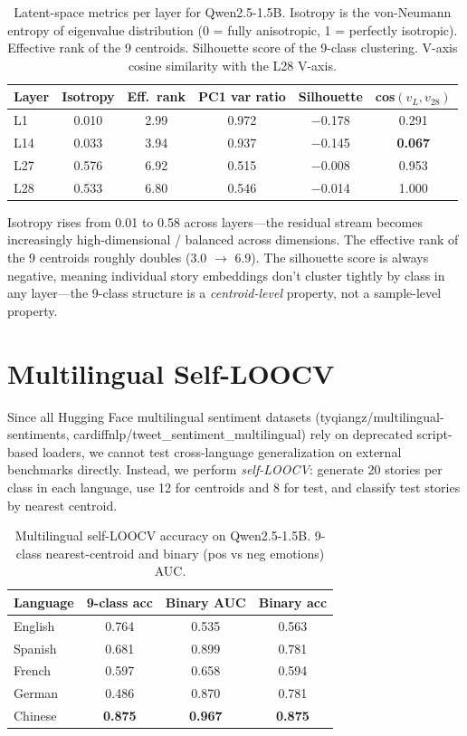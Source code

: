 \begin{table}[h]
\centering
\small
\caption{Latent-space metrics per layer for Qwen2.5-1.5B. Isotropy is the
von-Neumann entropy of eigenvalue distribution (0 = fully anisotropic, 1 =
perfectly isotropic). Effective rank of the 9 centroids. Silhouette score
of the 9-class clustering. V-axis cosine similarity with the L28 V-axis.}
\label{tab:sup_latent}
\begin{tabular}{lccccc}
\toprule
Layer & Isotropy & Eff.\ rank & PC1 var ratio & Silhouette & cos$(v_L, v_{28})$ \\
\midrule
L1 & 0.010 & 2.99 & 0.972 & $-$0.178 & 0.291 \\
L14 & 0.033 & 3.94 & 0.937 & $-$0.145 & \textbf{0.067} \\
L27 & 0.576 & 6.92 & 0.515 & $-$0.008 & 0.953 \\
L28 & 0.533 & 6.80 & 0.546 & $-$0.014 & 1.000 \\
\bottomrule
\end{tabular}
\end{table}

Isotropy rises from 0.01 to 0.58 across layers---the residual stream becomes
increasingly high-dimensional / balanced across dimensions. The effective
rank of the 9 centroids roughly doubles (3.0 $\to$ 6.9). The silhouette
score is always negative, meaning individual story embeddings don't cluster
tightly by class in any layer---the 9-class structure is a
\emph{centroid-level} property, not a sample-level property.

\section{Multilingual Self-LOOCV}
\label{sup:multilingual}

Since all Hugging Face multilingual sentiment datasets (tyqiangz/multilingual-sentiments,
cardiffnlp/tweet\_sentiment\_multilingual) rely on deprecated script-based
loaders, we cannot test cross-language generalization on external
benchmarks directly. Instead, we perform \emph{self-LOOCV}: generate 20
stories per class in each language, use 12 for centroids and 8 for test,
and classify test stories by nearest centroid.

\begin{table}[h]
\centering
\caption{Multilingual self-LOOCV accuracy on Qwen2.5-1.5B. 9-class
nearest-centroid and binary (pos vs neg emotions) AUC.}
\label{tab:sup_multilingual}
\begin{tabular}{lccc}
\toprule
Language & 9-class acc & Binary AUC & Binary acc \\
\midrule
English & 0.764 & 0.535 & 0.563 \\
Spanish & 0.681 & 0.899 & 0.781 \\
French  & 0.597 & 0.658 & 0.594 \\
German  & 0.486 & 0.870 & 0.781 \\
Chinese & \textbf{0.875} & \textbf{0.967} & \textbf{0.875} \\
\bottomrule
\end{tabular}
\end{table}

